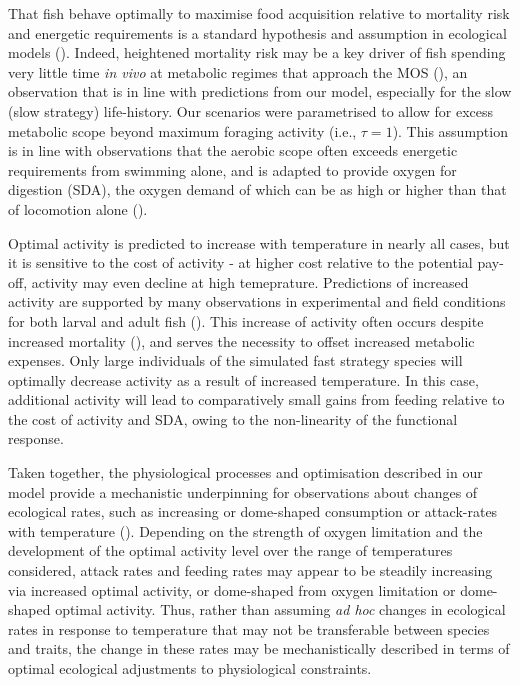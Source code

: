 \documentclass[11pt]{article}\usepackage[]{graphicx}\usepackage[]{color}
\begin{document}
That fish behave optimally to maximise food acquisition relative to mortality risk and energetic requirements is a standard hypothesis and assumption in ecological models (\cite{gilliam_habitat_1987,sainmont_effective_2015,priede_natural_1977, claireaux_influence_2000,hufnagl_physiological_2011}). Indeed, heightened mortality risk may be a key driver of fish spending very little time \emph{in vivo} at metabolic regimes that approach the MOS (\cite{priede_natural_1977}), an observation that is in line with predictions from our model, especially for the slow (slow strategy) life-history. Our scenarios were parametrised to allow for excess metabolic scope beyond maximum foraging activity (i.e., $\tau=1$). This assumption is in line with observations that the aerobic scope often exceeds energetic requirements from swimming alone, and is adapted to provide oxygen for digestion (SDA), the oxygen demand of which can be as high or higher than that of locomotion alone (\cite{priede_metabolic_1985}).

Optimal activity is predicted to increase with temperature in nearly all cases, but it is sensitive to the cost of activity - at higher cost relative to the potential pay-off, activity may even decline at high temeprature. Predictions of increased activity are supported by many observations in experimental and field conditions for both larval and adult fish (\cite{sswat_growth_2018,brown_feeding_1989,claireaux_physiology_1995, biro_mechanisms_2007}). This increase of activity often occurs despite increased mortality (\cite[e.g., ][]{sswat_growth_2018, biro_mechanisms_2007}), and serves the necessity to offset increased metabolic expenses. Only large individuals of the simulated fast strategy species will optimally decrease activity as a result of increased temperature. In this case, additional activity will lead to comparatively small gains from feeding relative to the cost of activity and SDA, owing to the non-linearity of the functional response.

Taken together, the physiological processes and optimisation described in our model provide a mechanistic underpinning for observations about changes of ecological rates, such as
increasing or dome-shaped consumption or attack-rates with temperature
(\cite{biro_mechanisms_2007,englund_temperature_2011,rall_universal_2012}). Depending on the
strength of oxygen limitation and the development of the optimal
activity level over the range of temperatures considered, attack rates
and feeding rates may appear to be steadily increasing via increased
optimal activity, or dome-shaped from oxygen limitation or dome-shaped
optimal activity. Thus, rather than assuming \emph{ad hoc} changes in ecological rates in response to temperature that may not be transferable between species and traits, the change in these rates may be mechanistically described in terms of optimal ecological adjustments to physiological constraints.
\end{document}
